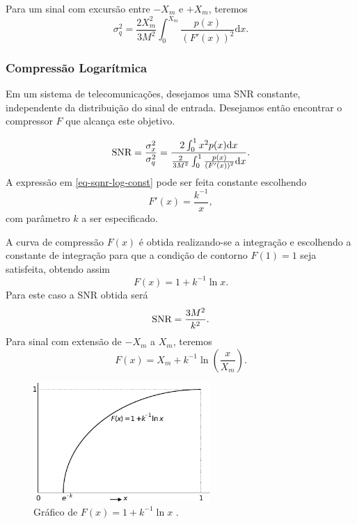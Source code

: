 \begin{frame}[allowframebreaks]
  Para um sinal com excursão entre $-X_m$ e $+X_m$, teremos
  \begin{equation} \label{eq-sqnr-q-nu2}
  \sigma_q^2 = \frac{2 X_m^2}{3M^2} \int_{0}^{X_m} \frac{p(x)}{ (F'(x))^2 } \mathrm{d}x  .
  \end{equation} 

\end{frame}

\begin{frame}[allowframebreaks]
  \frametitle{Compressão Logarítmica}
  Em um sistema de telecomunicações, desejamos uma SNR constante, independente da distribuição do sinal de entrada.
  Desejamos então encontrar o compressor $F$ que alcança este objetivo.

  \begin{equation} \label{eq-sqnr-log-const}
  \textmd{SNR} = \frac{\sigma_x^2}{\sigma_q^2} = \frac{2 \int_0^1 x^2 p(x) \mathrm{d}x}{ \frac{2}{3M^2} \int_0^1 \frac{p(x)}{(F'(x))^2} \mathrm{d}x } .
  \end{equation}
  A expressão em \ref{eq-sqnr-log-const} pode ser feita constante escolhendo
  \begin{equation} \label{eq-dcompr}
  F'(x) = \frac{k^{-1}}{x} ,
  \end{equation}
  com parâmetro $k$ a ser especificado.

  A curva de compressão $F(x)$ é obtida realizando-se a integração e escolhendo a constante de integração 
  para que a condição de contorno $F(1)=1$ seja satisfeita, obtendo assim
  \begin{equation} \label{eq-compr}
  F(x) = 1 + k^{-1} \ln x .
  \end{equation}
  Para este caso a SNR obtida será
  \begin{equation} \label{eq-sqnr-log-const2}
  \textmd{SNR} =  \frac{3M^2}{k^2} .
  \end{equation}
  Para sinal com extensão de $-X_m$ a $X_m$, teremos
  \begin{equation} \label{eq-compr2}
  F(x) = X_m + k^{-1} \ln \left(\frac{x}{X_m}\right) .
  \end{equation}

  \begin{figure}[h!]
  \centering
  \includegraphics[width=0.6\textwidth]{images/Fx.pdf}
  \caption{Gráfico de $F(x) = 1 + k^{-1} \ln x$ \citep{tokunbo}.}
  \label{fig:Fx}
  \end{figure}


\end{frame}

